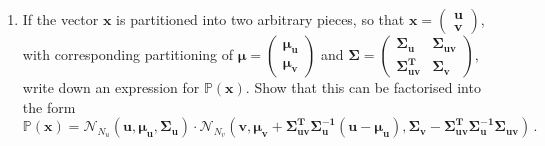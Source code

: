 \documentclass[a4paper,11pt]{article}
\begin{document}
\begin{enumerate}[resume]
\begin{enumerate}
\item If the vector $\mathbf{x}$ is partitioned into two arbitrary pieces, so that $\mathbf{x} = \left(\begin{array}{c}\mathbf{u}\\\mathbf{v}\end{array}\right)$, with corresponding partitioning of $\boldsymbol{\mu}=\left(\begin{array}{c}\boldsymbol{\mu}_\mathbf{u}\\\boldsymbol{\mu}_\mathbf{v}\end{array}\right)$ and $\boldsymbol{\Sigma}=\left(\begin{array}{cc}\boldsymbol{\Sigma}_\mathbf{u}&\boldsymbol{\Sigma}_\mathbf{uv}\\\boldsymbol{\Sigma}_\mathbf{uv}^\mathbf{T}&\boldsymbol{\Sigma}_\mathbf{v}\end{array}\right)$, write down an expression for $\mathbb{P}(\mathbf{x})$. Show that this can be factorised into the form
\[\mathbb{P}(\mathbf{x}) = \mathcal{N}_{N_u}\left(\mathbf{u},\boldsymbol{\mu}_\mathbf{u},\boldsymbol{\Sigma}_\mathbf{u}\right)\cdot\mathcal{N}_{N_v}\left(\mathbf{v},\boldsymbol{\mu}_\mathbf{v}+\boldsymbol{\Sigma}_\mathbf{uv}^\mathbf{T}\boldsymbol{\Sigma}_\mathbf{u}^\mathbf{-1}\left(\mathbf{u}-\boldsymbol{\mu}_\mathbf{u}\right),\boldsymbol{\Sigma}_\mathbf{v} - \boldsymbol{\Sigma}_\mathbf{uv}^\mathbf{T}\boldsymbol\Sigma_\mathbf{u}^\mathbf{-1}\boldsymbol{\Sigma}_\mathbf{uv}\right)\,.\]


\end{enumerate}
\end{enumerate}
\end{document}
